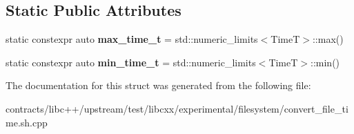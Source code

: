 \subsection*{Static Public Attributes}
\begin{DoxyCompactItemize}
\item 
\mbox{\label{structcheck__is__representable_3_01_file_time_t_00_01_time_t_00_01_time_spec_t_00_01_base_00_01_t_k__32_bit_01_4_ac8aa6ca4368c50c9a2a9a7e554bf52d9}} 
static constexpr auto {\bfseries max\+\_\+time\+\_\+t} = std\+::numeric\+\_\+limits$<$TimeT$>$\+::max()
\item 
\mbox{\label{structcheck__is__representable_3_01_file_time_t_00_01_time_t_00_01_time_spec_t_00_01_base_00_01_t_k__32_bit_01_4_aacb8a90a31c72ef3199c0410b9893e1c}} 
static constexpr auto {\bfseries min\+\_\+time\+\_\+t} = std\+::numeric\+\_\+limits$<$TimeT$>$\+::min()
\end{DoxyCompactItemize}


The documentation for this struct was generated from the following file\+:\begin{DoxyCompactItemize}
\item 
contracts/libc++/upstream/test/libcxx/experimental/filesystem/convert\+\_\+file\+\_\+time.\+sh.\+cpp\end{DoxyCompactItemize}
